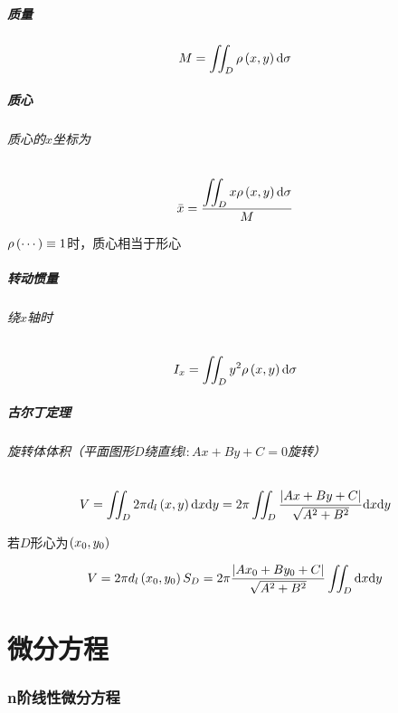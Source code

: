 \documentclass{article}
\begin{document}
\subsubsection{质量}

\[M=\iint_D\rho\left(x,y\right)\mathrm d\sigma\]

\subsubsection{质心}

\paragraph{质心的$x$坐标为}

\[\bar x=\frac{\displaystyle\iint_Dx\rho\left(x,y\right)\mathrm d\sigma}M\]

$\rho\left(\cdots\right)\equiv1$时，质心相当于形心

\subsubsection{转动惯量}

\paragraph{绕$x$轴时}

\[I_x=\iint_Dy^2\rho\left(x,y\right)\mathrm d\sigma\]

\subsubsection{古尔丁定理}

\paragraph{旋转体体积（平面图形$D$绕直线$l:Ax+By+C=0$旋转）}

\[V=\iint_D2\pi d_l\left(x,y\right)\mathrm d x\mathrm d y=2\pi\iint_D\frac{\left|Ax+By+C\right|}{\sqrt{A^2+B^2}}\mathrm d x\mathrm d y\]

\subparagraph{若$D$形心为$\left(x_0,y_0\right)$}

\[V=2\pi d_l\left(x_0,y_0\right)S_D=2\pi\frac{\left|Ax_0+By_0+C\right|}{\sqrt{A^2+B^2}}\iint_D\mathrm d x\mathrm d y\]

\part{微分方程}

\section{n阶线性微分方程}
\end{document}
